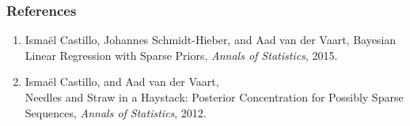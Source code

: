 \documentclass[usenames,dvipsnames]{beamer}
\begin{document}
\begin{frame}
	\frametitle{References}
	\begin{footnotesize}
	\begin{enumerate}		
		\item [CSV15] Isma\"el Castillo, Johannes Schmidt-Hieber, and Aad van der Vaart, Bayesian Linear Regression with Sparse Priors, \textit{Annals of Statistics}, 2015.

		\item [CV12] Isma\"el Castillo, and Aad van der Vaart, \\		Needles and Straw in a Haystack: Posterior Concentration for Possibly Sparse Sequences, \textit{Annals of Statistics}, 2012.
	\end{enumerate}
	\end{footnotesize}
\end{frame}
\end{document}

